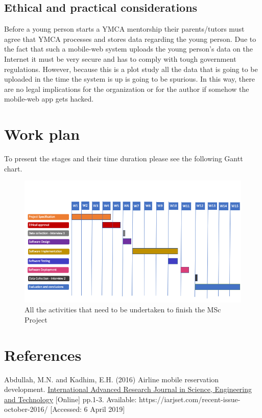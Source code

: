 \documentclass[version=last,fontsize=13pt]{scrartcl}
\begin{document}
\subsection{Ethical and practical considerations}
	Before a young person starts a YMCA mentorship their parents/tutors must agree that YMCA processes and stores data regarding the young person. Due to the fact that such a mobile-web system uploads the young person's data on the Internet it must be very secure and has to comply with tough government regulations. However, because this is a plot study all the data that is going to be uploaded in the time the system is up is going to be spurious. In this way, there are no legal implications for the organization or for the author if somehow the mobile-web app gets hacked. 

\pagebreak
\section{Work plan}%
To present the stages and their time duration please see the following Gantt chart.

	\begin{figure}[H]

		\includegraphics[scale = 0.65, angle = 270]{./imgs/ganttChart}
		\caption{All the activities that need to be undertaken to finish the MSc Project}
		\label{gC}

	\end{figure}

\pagebreak

\section*{References}
Abdullah, M.N. and Kadhim, E.H. (2016) Airline mobile reservation development.  \underline{International Advanced Research Journal in Science, Engineering and Technology} [Online]  pp.1-3. Available: https://iarjset.com/recent-issue-october-2016/ [Accessed: 6 April 2019]\\
\end{document}
